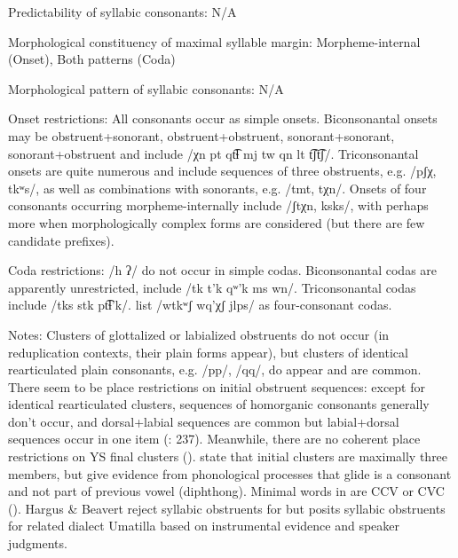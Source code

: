 {\begin{appendixdesc}
\item[Predictability of syllabic consonants:] N/A

\item[Morphological constituency of maximal syllable margin:] Morpheme-internal (Onset), Both patterns (Coda)

\item[Morphological pattern of syllabic consonants:] N/A

\item[Onset restrictions:] All consonants occur as simple onsets. Biconsonantal onsets may be obstruent+sonorant, obstruent+obstruent, sonorant+sonorant, sonorant+obstruent and include /χn pt qt͡ɬ mj tw qn lt t͡ʃt͡ʃ/. Triconsonantal onsets are quite numerous and include sequences of three obstruents, e.g. /pʃχ, tkʷs/, as well as combinations with sonorants, e.g. /tmt, tχn/. Onsets of four consonants occurring morpheme-internally include /ʃtχn, ksks/, with perhaps more when morphologically complex forms are considered (but there are few candidate prefixes).

\item[Coda restrictions:] /h ʔ/ do not occur in simple codas. Biconsonantal codas are apparently unrestricted, include /tk t’k qʷ'k ms wn/. Triconsonantal codas include /tks stk pt͡ɬ’k/. \citet{HargusBeavert2006} list /wtkʷʃ wq’χʃ jlps/ as four-consonant codas.

\item[Notes:] Clusters of glottalized or labialized obstruents do not occur (in reduplication contexts, their plain forms appear), but clusters of identical rearticulated plain consonants, e.g. /pp/, /qq/, do appear and are common. There seem to be place restrictions on initial obstruent sequences: except for identical rearticulated clusters, sequences of homorganic consonants generally don’t occur, and dorsal+labial sequences are common but labial+dorsal sequences occur in one item (\citealt{HargusBeavert2002}: 237). Meanwhile, there are no coherent place restrictions on YS final clusters (\citeyear[239]{HargusBeavert2002}). \citet{RigsbyRude1996} state that initial clusters are maximally three members, but \citet{HargusBeavert2006} give evidence from phonological processes that glide is a consonant and not part of previous vowel (diphthong). Minimal words in  are CCV or CVC (\citealt{HargusBeavert2006}). Hargus \& Beavert reject syllabic obstruents for  but \citet{Minthorn2005} posits syllabic obstruents for related dialect Umatilla based on instrumental evidence and speaker judgments.
\end{appendixdesc}
}
